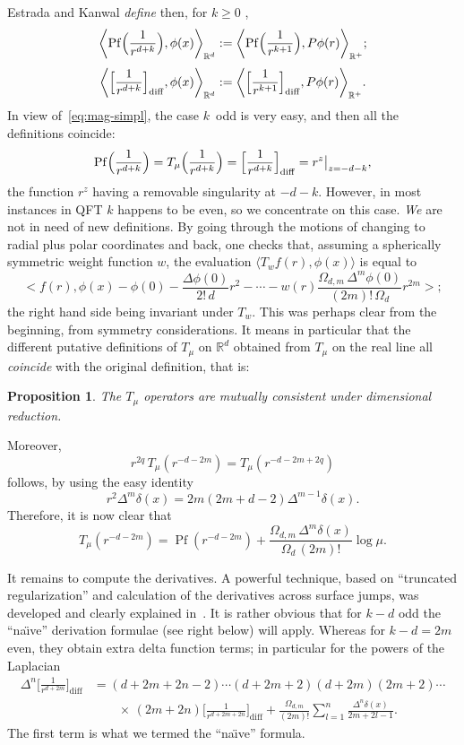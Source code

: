 \documentclass[a4paper,12pt]{article}
\newcommand{\Dl}{\Delta}           %
\newcommand{\diff}{{\mathrm{diff}}} %
\newcommand{\dl}{\delta}           %
\newcommand{\nn}{\nonumber}        %
\DeclareMathOperator{\Pf}{Pf}      %
\newcommand{\R}{\mathbb{R}}        %
\newcommand{\7}{\dagger}           %
\def\<#1,#2>{\langle#1,#2\rangle}  %
\theoremstyle{plain}
\newtheorem{prop}[thm]{Proposition} %
\theoremstyle{definition}
\begin{document}
\smallskip

Estrada and Kanwal \textit{define} then, for $k \geq 0$
\cite{wonderEKI,wonderEKII},
\begin{align*}
\biggl<\Pf\Bigl(\frac{1}{r^{d+k}}\Bigr),  \phi(x)\biggr>_{\R^d} &:=
\biggl<\Pf\Bigl(\frac{1}{r^{k+1}}\Bigr), P\phi(r)\biggr>_{\R^+};
\\[3pt]
\biggl<\Bigl[\frac{1}{r^{d+k}}\Bigr]_\diff,  \phi(x)\biggr>_{\R^d} &:=
\biggl<\Bigl[\frac{1}{r^{k+1}}\Bigr]_\diff, P\phi(r)\biggr>_{\R^+}.
\end{align*}
In view of~\eqref{eq:mag-simpl}, the case $k$~odd is very easy, and
then all the definitions coincide:
$$
\Pf\Bigl(\frac{1}{r^{d+k}}\Bigr) =
T_\mu\Bigl(\frac{1}{r^{d+k}}\Bigr) =
\Bigl[\frac{1}{r^{d+k}}\Bigr]_\diff = r^z\bigr|_{z=-d-k},
$$
the function $r^z$ having a removable singularity at $-d-k$. However,
in most instances in QFT $k$ happens to be even, so we concentrate on
this case. \textit{We} are not in need of new definitions. By going
through the motions of changing to radial plus polar coordinates and
back, one checks that, assuming a spherically symmetric weight
function $w$, the evaluation $\<T_wf(r), \phi(x)>$ is equal to
$$
\biggl<f(r), \phi(x) - \phi(0) - \frac{\Dl\phi(0)}{2!\,d} r^2 -\cdots-
w(r)\frac{\Omega_{d,m}\,\Dl^m\phi(0)}{(2m)!\,\Omega_d}r^{2m}\biggr>;
$$
the right hand side being invariant under $T_w$. This was perhaps
clear from the beginning, from symmetry considerations. It means in
particular that the different putative definitions of $T_\mu$ on
$\R^d$ obtained from $T_\mu$ on the real line all \textit{coincide}
with the original definition, that is:

\begin{prop}
The $T_\mu$ operators are mutually consistent under dimensional
reduction.
\end{prop}

Moreover,
$$
r^{2q}\, T_\mu(r^{-d-2m}) = T_\mu(r^{-d-2m+2q})
$$
follows, by using
the easy identity
$$
r^2 \Dl^m\dl(x) = 2m(2m+d-2) \Dl^{m-1}\dl(x).
$$
Therefore, it is now clear that
$$
T_\mu(r^{-d-2m}) = \Pf(r^{-d-2m})
+ \frac{\Omega_{d,m}\,\Dl^m\dl(x)}{\Omega_d\,(2m)!} \log\mu.
$$

It remains to compute the derivatives. A powerful technique, based on
``truncated regularization'' and calculation of the derivatives across
surface jumps, was developed and clearly explained
in~\cite{wonderEKI}. It is rather obvious that for $k - d$ odd the
``na\"{\i}ve'' derivation formulae (see right below) will apply.
Whereas for $k - d = 2m$ even, they obtain extra delta function terms;
in particular for the powers of the Laplacian
\begin{align}
\Dl^n \biggl[\frac{1}{r^{d+2m}}\biggr]_\diff
&= (d+2m+2n-2)\cdots(d+2m+2)(d+2m)(2m+2)\cdots
\nn \\
&\qquad \times\,(2m+2n) \biggl[\frac{1}{r^{d+2m+2n}}\biggr]_\diff
+ \frac{\Omega_{d,m}}{(2m)!} \sum_{l=1}^n \frac{\Dl^n\dl(x)}{2m+2l-1}.
\label{eq:super-machine}
\end{align}
The first term is what we termed the ``na\"{\i}ve'' formula.
\end{document}

